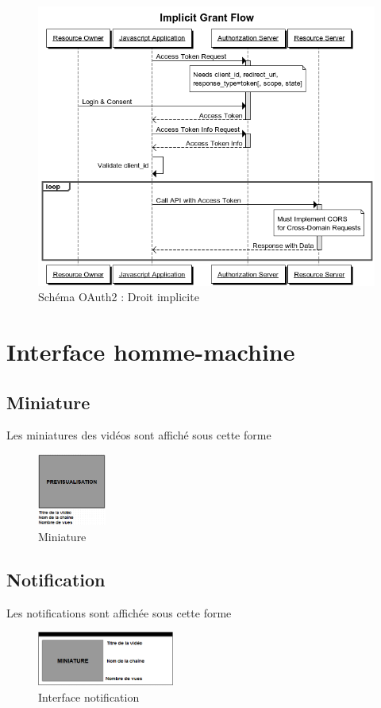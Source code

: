 \documentclass[11pt]{report} %
\begin{document}
			\begin{figure}[h]
				\center
				\includegraphics[width=1\textwidth]{../img/SchemaOAuth2.png}
				\caption{Schéma OAuth2 : Droit implicite}
				\label{oauth2}
			\end{figure}
			
			\newpage
	
	\section{Interface homme-machine}
		\subsection{Miniature}
		Les miniatures des vidéos sont affiché sous cette forme
		\begin{figure}[h]
			\center
			\includegraphics[width=0.2\textwidth]{../img/Miniature.png}
			\caption{Miniature}
			\label{Miniature}
		\end{figure}
		
		\subsection{Notification}
		Les notifications sont affichée sous cette forme
		\begin{figure}[h]
			\center
			\includegraphics[width=0.4\textwidth]{../img/NotificationInterface.png}
			\caption{Interface notification}
			\label{notification}
		\end{figure}
		
\end{document}
